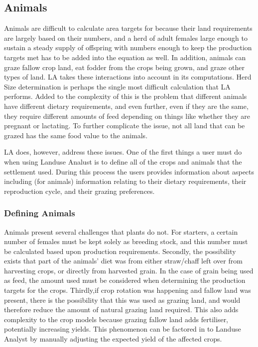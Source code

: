   \subsection{Animals}
    Animals are difficult to calculate area targets for because their land
    requirements are largely based on their numbers, and a herd of adult
    females large enough to sustain a steady supply of offspring with numbers
    enough to keep the production targets met has to be added into the equation
    as well.  In addition, animals can graze fallow crop land, eat fodder from
    the crops being grown, and graze other types of land.  LA takes these
    interactions into account in its computations.
    Herd Size determination is perhaps the single most difficult calculation
    that LA performs.  Added to the complexity of this is the problem that different
    animals have different dietary requirements, and even further, even if they
    are the same, they require different amounts of feed depending on things
    like whether they are pregnant or lactating.  To further complicate the issue,
    not all land that can be grazed has the same food value to the animals.

    LA does, however, address these issues.  One of the first things a user must
    do when using Landuse Analust is to define all of the crops and animals that
    the settlement used.  During this process the users provides information
    about aspects including (for animals) information
    relating to their dietary requirements, their reproduction cycle, and their
    grazing preferences.
    \subsubsection{Defining Animals}
    \label{definingAnimals}
      Animals present several challenges that plants do not.  For starters, a
      certain number of females must be kept solely as breeding stock, and this
      number must be calculated based upon production requirements.  Secondly,
      the possibility exists that part of the animals' diet was from either
      straw/chaff left over from harvesting crops, or directly from harvested
      grain.  In the case of grain being used as feed, the amount used must be
      considered when determining the production targets for the crops. 
      Thirdly,if crop rotation was happening and fallow land was present, there
      is the possibility that this was used as grazing land, and would therefore
      reduce the amount of natural grazing land required.  This also adds
      complexity to the crop models because grazing fallow land adds fertiliser,
      potentially increasing yields.  This phenomenon can be factored in to
      Landuse Analyst by manually adjusting the expected yield of the affected
      crops.


